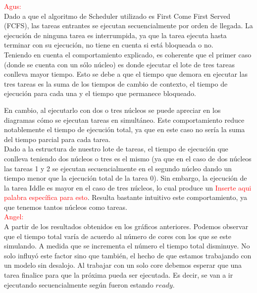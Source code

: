 \documentclass[a4paper]{article}
\begin{document}
 \textcolor{red}{Agus:}\\
 
 Dado a que el algoritmo de Scheduler utilizado es First Come First Served (FCFS), las tareas entrantes se ejecutan secuencialmente por orden de llegada. La ejecuci\'on de ninguna tarea es interrumpida, ya que la tarea ejecuta hasta terminar con su ejecuci\'on, no tiene en cuenta si est\'a bloqueada o no.\\

Teniendo en cuenta el comportamiento explicado, es coherente que el primer caso (donde se cuenta con un s\'olo n\'ucleo) es donde ejecutar el lote de tres tareas conlleva mayor tiempo. Esto se debe a que el tiempo que demora en ejecutar las tres tareas es la suma de los tiempos de cambio de contexto, el tiempo de ejecuci\'on para cada una y el tiempo que permanece bloqueado.

En cambio, al ejecutarlo con dos o tres n\'ucleos se puede apreciar en los diagramas c\'omo se ejecutan tareas en simult\'aneo. Este comportamiento reduce notablemente el tiempo de ejecuci\'on total, ya que en este caso no ser\'ia la suma del tiempo parcial para cada tarea.\\

Dado a la estructura de nuestro lote de tareas, el tiempo de ejecuci\'on que conlleva teniendo dos n\'ucleos o tres es el mismo (ya que en el caso de dos n\'ucleos las tareas 1 y 2 se ejecutan secuencialmente en el segundo n\'ucleo dando un tiempo menor que la ejecuci\'on total de la tarea 0). Sin embargo, la ejecuci\'on de la tarea Iddle es mayor en el caso de tres n\'ucleos, lo cual produce un \textcolor{red}{Inserte aqui palabra espec\'ifica para esto}. Resulta bastante intuitivo este comportamiento, ya que tenemos tantos n\'ucleos como tareas.\\

\textcolor{red}{Angel:}\\

A partir de los resultados obtenidos en los gráficos anteriores. Podemos observar que el tiempo total varía de acuerdo al número de cores con los que se este simulando. A medida que se incrementa el número el tiempo total disminuye. No solo influyó este factor sino que también, el hecho de que estamos trabajando con un modelo sin desalojo.  
Al trabajar con un solo core debemos esperar que una tarea finalice para que la próxima pueda ser ejecutada. Es decir, se van a ir ejecutando secuencialmente según fueron estando $ready$. \\
\end{document}
